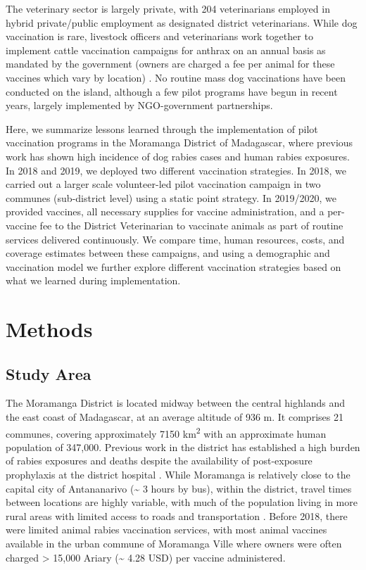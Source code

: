 \documentclass[tropicalmed,article,submit,moreauthors,pdftex]{mdpi}
\begin{document}
The veterinary sector is largely private, with 204 veterinarians
employed in hybrid private/public employment as designated district
veterinarians. While dog vaccination is rare, livestock officers and
veterinarians work together to implement cattle vaccination campaigns
for anthrax on an annual basis as mandated by the government (owners are
charged a fee per animal for these vaccines which vary by location)
\citep{mondiale2017evaluation}. No routine mass dog vaccinations have
been conducted on the island, although a few pilot programs have begun
in recent years, largely implemented by NGO-government partnerships.

Here, we summarize lessons learned through the implementation of pilot
vaccination programs in the Moramanga District of Madagascar, where
previous work has shown high incidence of dog rabies cases and human
rabies exposures. In 2018 and 2019, we deployed two different
vaccination strategies. In 2018, we carried out a larger scale
volunteer-led pilot vaccination campaign in two communes (sub-district
level) using a static point strategy. In 2019/2020, we provided
vaccines, all necessary supplies for vaccine administration, and a
per-vaccine fee to the District Veterinarian to vaccinate animals as
part of routine services delivered continuously. We compare time, human
resources, costs, and coverage estimates between these campaigns, and
using a demographic and vaccination model we further explore different
vaccination strategies based on what we learned during implementation.

\hypertarget{methods}{%
\section{Methods}\label{methods}}

\hypertarget{study-area}{%
\subsection{Study Area}\label{study-area}}

The Moramanga District is located midway between the central highlands
and the east coast of Madagascar, at an average altitude of 936 m. It
comprises 21 communes, covering approximately 7150 km\textsuperscript{2}
with an approximate human population of 347,000\citep{instat2021}.
Previous work in the district has established a high burden of rabies
exposures and deaths despite the availability of post-exposure
prophylaxis at the district hospital \citep{rajeev2018}. While Moramanga
is relatively close to the capital city of Antananarivo
(\textasciitilde{} 3 hours by bus), within the district, travel times
between locations are highly variable, with much of the population
living in more rural areas with limited access to roads and
transportation \citep{rajeev2020}. Before 2018, there were limited
animal rabies vaccination services, with most animal vaccines available
in the urban commune of Moramanga Ville where owners were often charged
\textgreater{} 15,000 Ariary (\textasciitilde{} 4.28 USD) per vaccine
administered.
\end{document}
